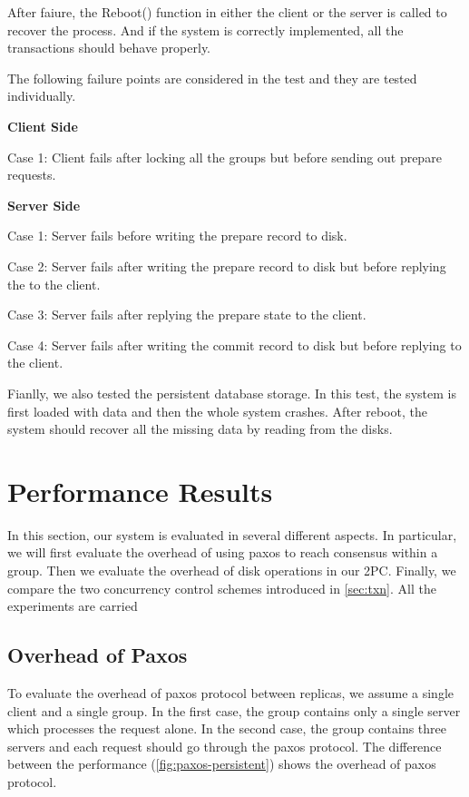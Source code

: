 \documentclass{vldb}
\begin{document}
After faiure, the Reboot() function in either the client or the server 
is called to recover the process. And if the system is correctly 
implemented, all the transactions should behave properly.

The following failure points are considered in the test and they are 
tested individually.

\textbf{Client Side}

Case 1: Client fails after locking all the groups but before sending 
out prepare requests.

\textbf{Server Side}

Case 1: Server fails before writing the prepare record to disk.

Case 2: Server fails after writing the prepare record to disk but 
before replying the to the client.

Case 3: Server fails after replying the prepare state to the client.

Case 4: Server fails after writing the commit record to disk but 
before replying to the client.

Fianlly, we also tested the persistent database storage. In this test, 
the system is first loaded with data and then the whole system 
crashes. After reboot, the system should recover all the missing data 
by reading from the disks. 

\section{Performance Results}
\label{sec:eval}

In this section, our system is evaluated in several different aspects.  
In particular, we will first evaluate the overhead of using paxos to 
reach consensus within a group. Then we evaluate the overhead of disk 
operations in our 2PC. Finally, we compare the two concurrency control 
schemes introduced in \cref{sec:txn}. All the experiments are carried 

\subsection{Overhead of Paxos}

To evaluate the overhead of paxos protocol between replicas, we assume 
a single client and a single group.  In the first case, the group 
contains only a single server which processes the request alone.  In 
the second case, the group contains three servers and each request 
should go through the paxos protocol.  The difference between the 
performance (\cref{fig:paxos-persistent}) shows the overhead of paxos 
protocol. 
\end{document}
